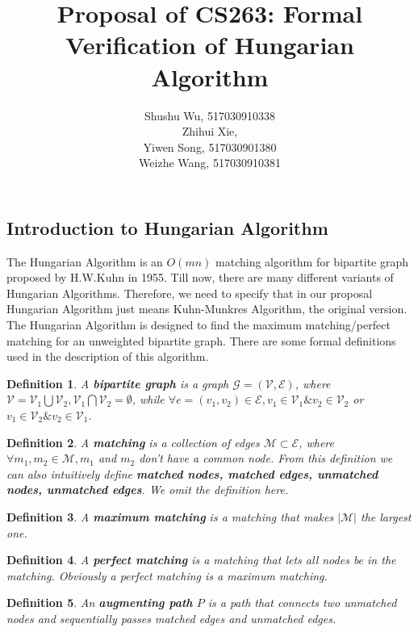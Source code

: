\documentclass{paper}
\title{Proposal of CS263: Formal Verification of Hungarian Algorithm}
\author{Shushu Wu, 517030910338\\ Zhihui Xie,  \\Yiwen Song, 517030901380\\Weizhe Wang, 517030910381}
\newtheorem{definition}{Definition}
\begin{document}
\maketitle
\begin{spacing}{1.2}
\section{Introduction to Hungarian Algorithm}
    The Hungarian Algorithm \cite{Hungarian} is an $O(mn)$ matching algorithm for bipartite graph proposed by H.W.Kuhn in 1955. Till now, there are many different variants of Hungarian Algorithms. Therefore, we need to specify that in our proposal Hungarian Algorithm just means Kuhn-Munkres Algorithm, the original version. \\
    The Hungarian Algorithm is designed to find the maximum matching/perfect matching for an unweighted bipartite graph. There are some formal definitions used in the description of this algorithm.
    \begin{definition}\label{bipartiteGraph}
        A \textbf{bipartite graph} is a graph $\mathcal{G}=(\mathcal{V}, \mathcal{E})$, where $\mathcal{V}=\mathcal{V}_1\bigcup\mathcal{V}_2, \mathcal{V}_1\bigcap\mathcal{V}_2=\emptyset$, while $\forall e=(v_1, v_2)\in\mathcal{E}, v_1\in\mathcal{V}_1\& v_2\in\mathcal{V}_2$ or $v_1\in\mathcal{V}_2\&v_2\in\mathcal{V}_1$.
    \end{definition}
    \begin{definition}\label{matching}
        A \textbf{matching} is a collection of edges $\mathcal{M}\subset\mathcal{E}$, where $\forall m_1, m_2\in\mathcal{M}, m_1$ and $m_2$ don't have a common node. From this definition we can also intuitively define \textbf{matched nodes, matched edges, unmatched nodes, unmatched edges}. We omit the definition here.
    \end{definition}
    \begin{definition}\label{maximumMatching}
        A \textbf{maximum matching} is a matching that makes $|\mathcal{M}|$ the largest one.
    \end{definition}
    \begin{definition}\label{perfectMatching}
        A \textbf{perfect matching} is a matching that lets all nodes be in the matching. Obviously a perfect matching is a maximum matching.
    \end{definition}
    \begin{definition}\label{augmentingPath}
        An \textbf{augmenting path} $P$ is a path that connects two unmatched nodes and sequentially passes matched edges and unmatched edges.

\end{definition}
\end{spacing}
\end{document}
